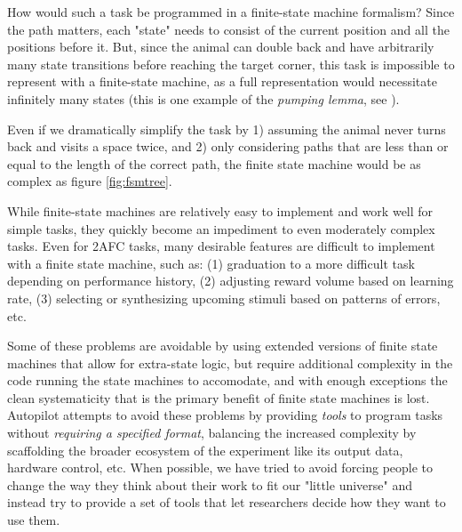 How would such a task be programmed in a finite-state machine formalism? Since the path matters, each "state" needs to consist of the current position and all the positions before it. But, since the animal can double back and have arbitrarily many state transitions before reaching the target corner, this task is impossible to represent with a finite-state machine, as a full representation would necessitate infinitely many states (this is one example of the \textit{pumping lemma}, see \citep{kozenLimitationsFiniteAutomata1997}).

Even if we dramatically simplify the task by 1) assuming the animal never turns back and visits a space twice, and 2) only considering paths that are less than or equal to the length of the correct path, the finite state machine would be as complex as figure \ref{fig:fsmtree}. 

While finite-state machines are relatively easy to implement and work well for simple tasks, they quickly become an impediment to even moderately complex tasks. Even for 2AFC tasks, many desirable features are difficult to implement with a finite state machine, such as: (1) graduation to a more difficult task depending on performance history, (2) adjusting reward volume based on learning rate, (3) selecting or synthesizing upcoming stimuli based on patterns of errors\citep{bakAdaptiveOptimalTraining2016}, etc. 

Some of these problems are avoidable by using extended versions of finite state machines that allow for extra-state logic, but require additional complexity in the code running the state machines to accomodate, and with enough exceptions the clean systematicity that is the primary benefit of finite state machines is lost. Autopilot attempts to avoid these problems by providing \textit{tools} to program tasks without \textit{requiring a specified format}, balancing the increased complexity by scaffolding the broader ecosystem of the experiment like its output data, hardware control, etc. When possible, we have tried to avoid forcing people to change the way they think about their work to fit our "little universe" and instead try to provide a set of tools that let researchers decide how they want to use them.

